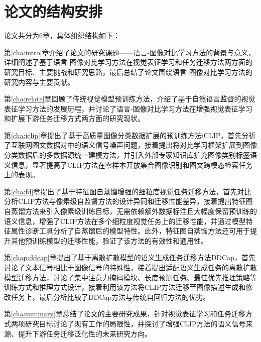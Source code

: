 \section{论文的结构安排}

论文共分为6章，具体组织结构如下：

第\ref{cha:intro}章介绍了论文的研究课题——语言-图像对比学习方法的背景与意义，详细阐述了基于语言-图像对比学习方法在视觉表征学习和任务迁移方法两方面的研究目标、主要挑战和研究思路，最后总结了论文围绕语言-图像对比学习方法的研究内容与主要贡献。

第\ref{cha:relate}章回顾了传统视觉模型预训练方法，介绍了基于自然语言监督的视觉表征学习方法的发展历程，并讨论了语言-图像对比学习方法在增强视觉表征学习和扩展下游任务迁移方式两方面的研究现状。

第\ref{cha:iclip}章提出了基于高质量图像分类数据扩展的预训练方法iCLIP，首先分析了互联网图文数据对中的语义信号噪声问题，接着提出将对比学习框架扩展到图像分类数据后的多数据源统一建模方法，并引入外部专家知识库扩充图像类别标签语义信息，显著提高了CLIP方法在零样本开放集合图像识别和图文跨模态检索任务上的表现。

第\ref{cha:fd}章提出了基于特征图自蒸馏增强的细粒度视觉任务迁移方法，首先对比分析CLIP方法与像素级自监督方法的设计异同和迁移性能差异，接着提出特征图自蒸馏方法来引入像素级训练目标，无需依赖额外数据标注且大幅度保留预训练的语义信息，增强了CLIP方法在多个细粒度视觉任务上的迁移性能，并通过模型特征属性诊断工具分析了自蒸馏后的模型特性。此外，特征图自蒸馏方法还可用于提升其他预训练模型的迁移性能，验证了该方法的有效性和通用性。

第\ref{chap:ddcap}章提出了基于离散扩散模型的语义生成任务迁移方法DDCap，首先讨论了文本信号相比于图像信号的特殊性，接着提出适配语义生成任务的离散扩散模型迁移方法，讨论了集中注意力掩码模块、长度预测任务、最佳优先推理策略等训练方式和推理方式设计，接着利用该方法将CLIP方法迁移至图像描述生成和修改任务上，最后分析比较了DDCap方法与传统自回归方法的优劣。

第\ref{cha:summary}章总结了论文的主要研究成果，针对视觉表征学习和任务迁移方式两项研究目标讨论了现有工作的局限性，并探讨了增强CLIP方法的语义信号来源、提升下游任务迁移泛化性的未来研究方向。